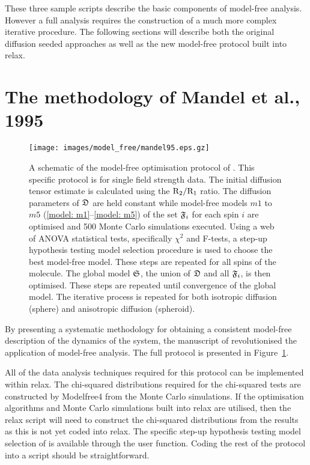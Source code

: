 \begin{htmlonly}
\begin{htmlonly}
These three sample scripts describe the basic components of model-free analysis.  However a full analysis requires the construction of a much more complex iterative procedure.  The following sections will describe both the original diffusion seeded approaches as well as the new model-free protocol built into relax.



\section{The methodology of Mandel et al., 1995}
\label{sect: Mandel 1995}

\begin{figure}
\centerline{\texttt{[image: images/model\_free/mandel95.eps.gz]}}
\caption[A schematic of the model-free optimisation protocol of Mandel et al., 1995]{A schematic of the model-free optimisation protocol of \citet{Mandel95}.  This specific protocol is for single field strength data.  The initial diffusion tensor estimate is calculated using the $\mathrm{R}_2/\mathrm{R}_1$ ratio.  The diffusion parameters of $\mathfrak{D}$ are held constant while model-free models $m1$ to $m5$ (\ref{model: m1}--\ref{model: m5}) of the set $\mathfrak{F}_i$ for each spin $i$ are optimised and 500 Monte Carlo simulations executed.  Using a web of ANOVA statistical tests, specifically $\chi^2$ and F-tests, a step-up hypothesis testing model selection procedure is used to choose the best model-free model.  These steps are repeated for all spins of the molecule.  The global model $\mathfrak{S}$, the union of $\mathfrak{D}$ and all $\mathfrak{F}_i$, is then optimised.  These steps are repeated until convergence of the global model.  The iterative process is repeated for both isotropic diffusion (sphere) and anisotropic diffusion (spheroid).} \label{fig: Mandel et al.}
\end{figure}

By presenting a systematic methodology for obtaining a consistent model-free description of the dynamics of the system, the manuscript of \citet{Mandel95} revolutionised the application of model-free analysis.  The full protocol is presented in Figure~\ref{fig: Mandel et al.}.

All of the data analysis techniques required for this protocol can be implemented within relax.  The chi-squared distributions required for the chi-squared tests are constructed by Modelfree4 from the Monte Carlo simulations.  If the optimisation algorithms and Monte Carlo simulations built into relax are utilised, then the relax script will need to construct the chi-squared distributions from the results as this is not yet coded into relax.  The specific step-up hypothesis testing model selection of \citet{Mandel95} is available through the  user function.  Coding the rest of the protocol into a script should be straightforward.


\end{htmlonly}
\end{htmlonly}
